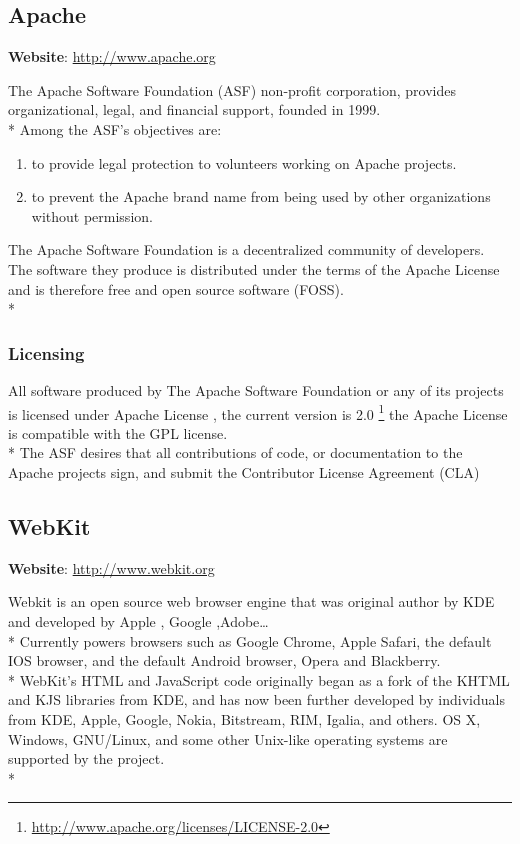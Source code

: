 \documentclass[11pt]{article} %
\begin{document}
\subsection{Apache} %

\textbf{Website}: \url {http://www.apache.org} 

The Apache Software Foundation (ASF) non-profit corporation, provides organizational, legal, and financial support, founded in 1999.\\*
Among the ASF's objectives are: 
\begin{enumerate}
\item  to provide legal protection to volunteers working on Apache projects.
\item to prevent the Apache brand name from being used by other organizations without permission.
\end{enumerate}
The Apache Software Foundation is a decentralized community of developers. The software they produce is distributed under the terms of the Apache License and is therefore free and open source software (FOSS).\\*
\subsubsection{Licensing}
All software produced by The Apache Software Foundation or any of its projects  is licensed under  Apache License , the current version is 2.0 \footnote{\url{http://www.apache.org/licenses/LICENSE-2.0}} the Apache License is compatible with the GPL license.\\*  
The ASF desires that all contributions of code, or documentation to the Apache projects sign, and submit the Contributor License Agreement (CLA)

\subsection{WebKit} %

\textbf{Website}: \url {http://www.webkit.org}

Webkit is an open source web browser engine that was original author by KDE and developed  by Apple , Google ,Adobe\ldots \\*
Currently powers browsers such as Google Chrome, Apple Safari, the default IOS browser, and the default Android browser, Opera and Blackberry. \\*
WebKit's HTML and JavaScript code originally began as a fork of the KHTML and KJS libraries from KDE, and has now been further developed by individuals from KDE, Apple, Google, Nokia, Bitstream, RIM, Igalia, and others. OS X, Windows, GNU/Linux, and some other Unix-like operating systems are supported by the project.\\*
\end{document}
